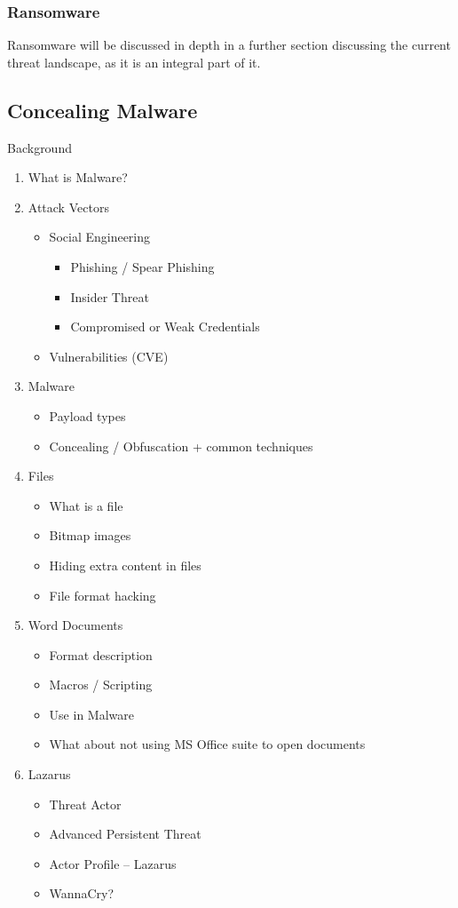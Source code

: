 \subsubsection{Ransomware}
Ransomware will be discussed in depth in a further section discussing the current threat landscape, as it is an integral
part of it.

\subsection{Concealing Malware}

Background
\begin{enumerate}
  \item What is Malware?
  \item Attack Vectors
    \begin{itemize}
      \item Social Engineering
        \begin{itemize}
          \item Phishing / Spear Phishing
          \item Insider Threat
          \item Compromised or Weak Credentials
        \end{itemize}
      \item Vulnerabilities (CVE)
    \end{itemize}
  \item Malware
  \begin{itemize}
    \item Payload types
    \item Concealing / Obfuscation + common techniques
  \end{itemize}
  \item Files
    \begin{itemize}
      \item What is a file
      \item Bitmap images
      \item Hiding extra content in files
      \item File format hacking
    \end{itemize}
  \item Word Documents
    \begin{itemize}
      \item Format description
      \item Macros / Scripting
      \item Use in Malware
      \item What about not using MS Office suite to open documents
    \end{itemize}
  \item Lazarus
    \begin{itemize}
      \item Threat Actor
      \item Advanced Persistent Threat
      \item Actor Profile -- Lazarus
      \item WannaCry?
    \end{itemize}
\end{enumerate}
